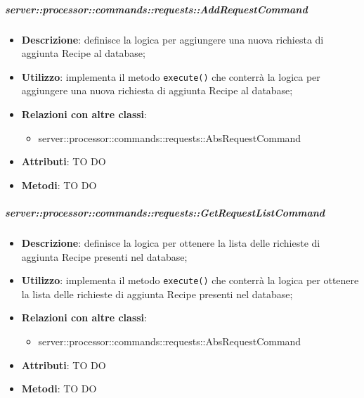         \subparagraph{server::processor::commands::requests::AddRequestCommand} %
        \label{subp:bdsm_app_server_processor_commands_requests_addrequestcommand}
        \begin{itemize}
          \item \textbf{Descrizione}: definisce la logica per aggiungere una nuova richiesta di aggiunta Recipe al database;
          \item \textbf{Utilizzo}: implementa il metodo \texttt{execute()} che conterrà la logica per aggiungere una nuova richiesta di aggiunta Recipe al database;
          \item \textbf{Relazioni con altre classi}:
            \begin{itemize}
              \item server::processor::commands::requests::AbsRequestCommand
            \end{itemize}
			\item \textbf{Attributi}: TO DO
			\item \textbf{Metodi}: TO DO
        \end{itemize}

        \subparagraph{server::processor::commands::requests::GetRequestListCommand} %
        \label{subp:bdsm_app_server_processor_commands_requests_getrequestlistcommand}
        \begin{itemize}
          \item \textbf{Descrizione}: definisce la logica per ottenere la lista delle richieste di aggiunta Recipe presenti nel database;
          \item \textbf{Utilizzo}: implementa il metodo \texttt{execute()} che conterrà la logica per ottenere la lista delle richieste di aggiunta Recipe presenti nel database;
          \item \textbf{Relazioni con altre classi}:
            \begin{itemize}
              \item server::processor::commands::requests::AbsRequestCommand
            \end{itemize}
			\item \textbf{Attributi}: TO DO
			\item \textbf{Metodi}: TO DO
        \end{itemize}

